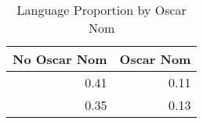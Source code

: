 \begin{table}[H]
\centering
\begin{tabular}{rr}
  \hline
No Oscar Nom & Oscar Nom \\ 
  \hline
0.41 & 0.11 \\ 
  0.35 & 0.13 \\ 
   \hline
\end{tabular}
\caption{Language Proportion by Oscar Nom} 
\end{table}

